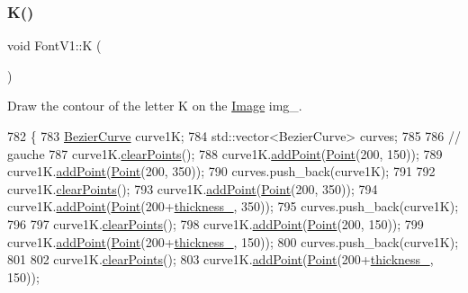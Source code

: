 \subsubsection{\texorpdfstring{K()}{K()}}
{\footnotesize\ttfamily void Font\+V1\+::K (\begin{DoxyParamCaption}{ }\end{DoxyParamCaption})}



Draw the contour of the letter K on the \mbox{\hyperlink{class_image}{Image}} img\+\_\+. 


\begin{DoxyCode}
782               \{
783     \mbox{\hyperlink{class_bezier_curve}{BezierCurve}} curve1K;
784     std::vector<BezierCurve> curves;
785 
786     \textcolor{comment}{// gauche}
787     curve1K.\mbox{\hyperlink{class_bezier_curve_a0ba8ce66d5af5971ae6a1b506029728e}{clearPoints}}();
788     curve1K.\mbox{\hyperlink{class_bezier_curve_a38d16c18b36ae45619b05e26e226cf34}{addPoint}}(\mbox{\hyperlink{class_point}{Point}}(200, 150));
789     curve1K.\mbox{\hyperlink{class_bezier_curve_a38d16c18b36ae45619b05e26e226cf34}{addPoint}}(\mbox{\hyperlink{class_point}{Point}}(200, 350));
790     curves.push\_back(curve1K);
791 
792     curve1K.\mbox{\hyperlink{class_bezier_curve_a0ba8ce66d5af5971ae6a1b506029728e}{clearPoints}}();
793     curve1K.\mbox{\hyperlink{class_bezier_curve_a38d16c18b36ae45619b05e26e226cf34}{addPoint}}(\mbox{\hyperlink{class_point}{Point}}(200, 350));
794     curve1K.\mbox{\hyperlink{class_bezier_curve_a38d16c18b36ae45619b05e26e226cf34}{addPoint}}(\mbox{\hyperlink{class_point}{Point}}(200+\mbox{\hyperlink{class_font_v1_aed8040e76be9a52833627b92f0fb4e5f}{thickness\_}}, 350));
795     curves.push\_back(curve1K);
796 
797     curve1K.\mbox{\hyperlink{class_bezier_curve_a0ba8ce66d5af5971ae6a1b506029728e}{clearPoints}}();
798     curve1K.\mbox{\hyperlink{class_bezier_curve_a38d16c18b36ae45619b05e26e226cf34}{addPoint}}(\mbox{\hyperlink{class_point}{Point}}(200, 150));
799     curve1K.\mbox{\hyperlink{class_bezier_curve_a38d16c18b36ae45619b05e26e226cf34}{addPoint}}(\mbox{\hyperlink{class_point}{Point}}(200+\mbox{\hyperlink{class_font_v1_aed8040e76be9a52833627b92f0fb4e5f}{thickness\_}}, 150));
800     curves.push\_back(curve1K);
801 
802     curve1K.\mbox{\hyperlink{class_bezier_curve_a0ba8ce66d5af5971ae6a1b506029728e}{clearPoints}}();
803     curve1K.\mbox{\hyperlink{class_bezier_curve_a38d16c18b36ae45619b05e26e226cf34}{addPoint}}(\mbox{\hyperlink{class_point}{Point}}(200+\mbox{\hyperlink{class_font_v1_aed8040e76be9a52833627b92f0fb4e5f}{thickness\_}}, 150));

\end{DoxyCode}
